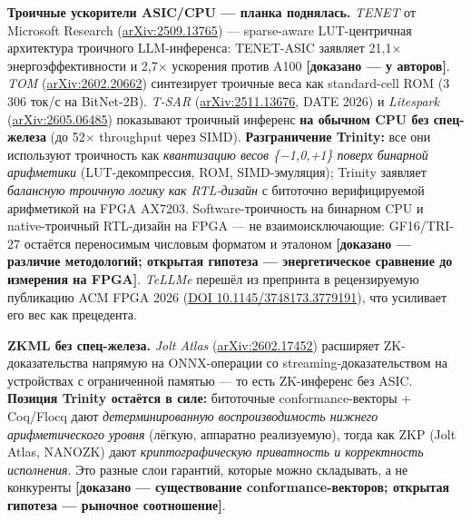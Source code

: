 \documentclass[
  russian,
]{article}
\begin{document}
\textbf{Троичные ускорители ASIC/CPU --- планка поднялась.} \emph{TENET}
от Microsoft Research
(\href{https://arxiv.org/abs/2509.13765}{arXiv:2509.13765}) ---
sparse-aware LUT-центричная архитектура троичного LLM-инференса:
TENET-ASIC заявляет 21,1× энергоэффективности и 2,7× ускорения против
A100 \textbf{{[}доказано --- у авторов{]}}. \emph{TOM}
(\href{https://arxiv.org/abs/2602.20662}{arXiv:2602.20662}) синтезирует
троичные веса как standard-cell ROM (3 306 ток/с на BitNet-2B).
\emph{T-SAR} (\href{https://arxiv.org/abs/2511.13676}{arXiv:2511.13676},
DATE 2026) и \emph{Litespark}
(\href{https://arxiv.org/abs/2605.06485}{arXiv:2605.06485}) показывают
троичный инференс \textbf{на обычном CPU без спец-железа} (до 52×
throughput через SIMD). \textbf{Разграничение Trinity:} все они
используют троичность как \emph{квантизацию весов \{−1,0,+1\} поверх
бинарной арифметики} (LUT-декомпрессия, ROM, SIMD-эмуляция); Trinity
заявляет \emph{балансную троичную логику как RTL-дизайн} с
битоточно верифицируемой арифметикой на FPGA AX7203. Software-троичность на бинарном
CPU и native-троичный RTL-дизайн на FPGA --- не взаимоисключающие: GF16/TRI-27
остаётся переносимым числовым форматом и эталоном \textbf{{[}доказано
--- различие методологий; открытая гипотеза --- энергетическое сравнение
до измерения на FPGA{]}}. \emph{TeLLMe} перешёл из препринта в
рецензируемую публикацию ACM FPGA 2026
(\href{https://doi.org/10.1145/3748173.3779191}{DOI
10.1145/3748173.3779191}), что усиливает его вес как прецедента.

\textbf{ZKML без спец-железа.} \emph{Jolt Atlas}
(\href{https://arxiv.org/abs/2602.17452}{arXiv:2602.17452}) расширяет
ZK-доказательства напрямую на ONNX-операции со streaming-доказательством
на устройствах с ограниченной памятью --- то есть ZK-инференс без ASIC.
\textbf{Позиция Trinity остаётся в силе:} битоточные conformance-векторы
+ Coq/Flocq дают \emph{детерминированную воспроизводимость нижнего
арифметического уровня} (лёгкую, аппаратно реализуемую), тогда как ZKP
(Jolt Atlas, NANOZK) дают \emph{криптографическую приватность и
корректность исполнения}. Это разные слои гарантий, которые можно
складывать, а не конкуренты \textbf{{[}доказано --- существование
conformance-векторов; открытая гипотеза --- рыночное соотношение{]}}.
\end{document}
